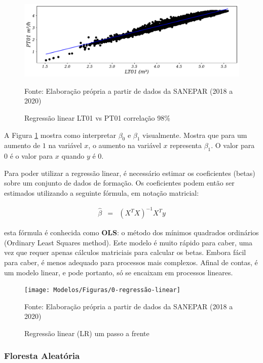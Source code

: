 \begin{figure}[H]
	\centering
	\caption{Regressão linear LT01 vs PT01 correlação 98\%}
	\label{fig:lr-lt01-m3}
	\includegraphics[width=1\linewidth]{"Modelos/Figuras/LR LT01 (m³)"}
	
	Fonte: Elaboração própria a partir de dados da SANEPAR (2018 a 2020)
\end{figure}



A Figura \ref{fig:lr-lt01-m3} mostra como interpretar $\beta_0$ e $\beta_1$ visualmente. Mostra que para um aumento de $1$ na variável $x$, o aumento na variável $x$ representa $\beta_1$. O valor para $0$ é o valor para $x$ quando $y$ é $0$.

Para poder utilizar a regressão linear, é necessário estimar os coeficientes (betas) sobre um conjunto de dados de formação. Os coeficientes podem então ser estimados utilizando a seguinte fórmula, em notação matricial:

\begin{eqnarray}
	\hat{\beta}&=&\left(X^T X\right)^{-1} X^T y\label{eq:ols}
\end{eqnarray}

 esta fórmula é conhecida como \textbf{OLS}: o método dos mínimos quadrados ordinários (Ordinary Least Squares method). Este modelo é muito rápido para caber, uma vez que requer apenas cálculos matriciais para calcular os betas. Embora fácil para caber, é menos adequado para processos mais complexos. Afinal de contas, é um modelo linear, e pode portanto, só se encaixam em processos lineares.

\begin{figure}[H]
	\centering
	\caption{Regressão linear (LR) um passo a frente}
	\label{fig:1-regressao-linear}
	\texttt{[image: Modelos/Figuras/0-regressão-linear]}
	
	Fonte: Elaboração própria a partir de dados da SANEPAR (2018 a 2020)
\end{figure}


\subsubsection{Floresta Aleat\'oria} \label{subsubsec:rf}


